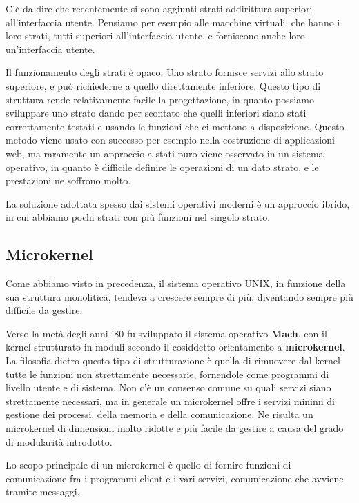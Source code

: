         C'è da dire che recentemente si sono aggiunti strati addirittura superiori all'interfaccia utente. Pensiamo per esempio alle macchine virtuali, che hanno i loro strati, tutti superiori all'interfaccia utente, e forniscono anche loro un'interfaccia utente.
        
        Il funzionamento degli strati è opaco. Uno strato fornisce servizi allo strato superiore, e può richiederne a quello direttamente inferiore. Questo tipo di struttura rende relativamente facile la progettazione, in quanto possiamo sviluppare uno strato dando per scontato che quelli inferiori siano stati correttamente testati e usando le funzioni che ci mettono a disposizione. Questo metodo viene usato con successo per esempio nella costruzione di applicazioni web, ma raramente un approccio a stati puro viene osservato in un sistema operativo, in quanto è difficile definire le operazioni di un dato strato, e le prestazioni ne soffrono molto.
        
        La soluzione adottata spesso dai sistemi operativi moderni è un approccio ibrido, in cui abbiamo pochi strati con più funzioni nel singolo strato.
        
    \subsection{Microkernel}
        Come abbiamo visto in precedenza, il sistema operativo UNIX, in funzione della sua struttura monolitica, tendeva a crescere sempre di più, diventando sempre più difficile da gestire.
        
        Verso la metà degli anni '80 fu sviluppato il sistema operativo \textbf{Mach}, con il kernel strutturato in moduli secondo il cosiddetto orientamento a \textbf{microkernel}. La filosofia dietro questo tipo di strutturazione è quella di rimuovere dal kernel tutte le funzioni non strettamente necessarie, fornendole come programmi di livello utente e di sistema. Non c'è un consenso comune su quali servizi siano strettamente necessari, ma in generale un microkernel offre i servizi minimi di gestione dei processi, della memoria e della comunicazione. Ne risulta un microkernel di dimensioni molto ridotte e più facile da gestire a causa del grado di modularità introdotto.
        
        Lo scopo principale di un microkernel è quello di fornire funzioni di comunicazione fra i programmi client e i vari servizi, comunicazione che avviene tramite messaggi.
        
